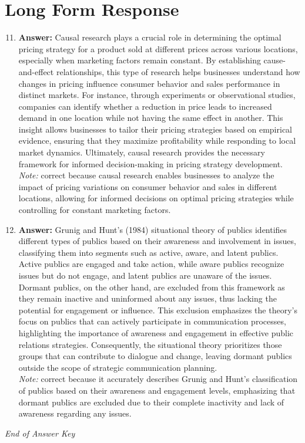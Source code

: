 \documentclass[12pt]{article}
\begin{document}
\section*{Long Form Response}
\begin{enumerate}[label=\arabic*.]
\setcounter{enumi}{10}
\item \textbf{Answer:} Causal research plays a crucial role in determining the optimal pricing strategy for a product sold at different prices across various locations, especially when marketing factors remain constant. By establishing cause-and-effect relationships, this type of research helps businesses understand how changes in pricing influence consumer behavior and sales performance in distinct markets. For instance, through experiments or observational studies, companies can identify whether a reduction in price leads to increased demand in one location while not having the same effect in another. This insight allows businesses to tailor their pricing strategies based on empirical evidence, ensuring that they maximize profitability while responding to local market dynamics. Ultimately, causal research provides the necessary framework for informed decision-making in pricing strategy development.
\\ \textit{Note:} correct because causal research enables businesses to analyze the impact of pricing variations on consumer behavior and sales in different locations, allowing for informed decisions on optimal pricing strategies while controlling for constant marketing factors.
\item \textbf{Answer:} Grunig and Hunt's (1984) situational theory of publics identifies different types of publics based on their awareness and involvement in issues, classifying them into segments such as active, aware, and latent publics. Active publics are engaged and take action, while aware publics recognize issues but do not engage, and latent publics are unaware of the issues. Dormant publics, on the other hand, are excluded from this framework as they remain inactive and uninformed about any issues, thus lacking the potential for engagement or influence. This exclusion emphasizes the theory's focus on publics that can actively participate in communication processes, highlighting the importance of awareness and engagement in effective public relations strategies. Consequently, the situational theory prioritizes those groups that can contribute to dialogue and change, leaving dormant publics outside the scope of strategic communication planning.
\\ \textit{Note:} correct because it accurately describes Grunig and Hunt's classification of publics based on their awareness and engagement levels, emphasizing that dormant publics are excluded due to their complete inactivity and lack of awareness regarding any issues.
\end{enumerate}

\vfill
\noindent\textit{End of Answer Key}
\end{document}
